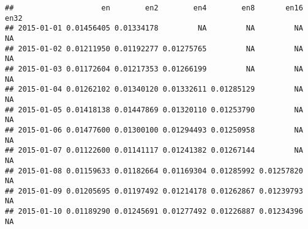 \documentclass[
]{article}
\newenvironment{Shaded}{\begin{snugshade}}{\end{snugshade}}
\newcommand{\AttributeTok}[1]{\textcolor[rgb]{0.13,0.29,0.53}{#1}}
\newcommand{\CommentTok}[1]{\textcolor[rgb]{0.56,0.35,0.01}{\textit{#1}}}
\newcommand{\DecValTok}[1]{\textcolor[rgb]{0.00,0.00,0.81}{#1}}
\newcommand{\FunctionTok}[1]{\textcolor[rgb]{0.13,0.29,0.53}{\textbf{#1}}}
\newcommand{\NormalTok}[1]{#1}
\newcommand{\OtherTok}[1]{\textcolor[rgb]{0.56,0.35,0.01}{#1}}
\newcommand{\SpecialCharTok}[1]{\textcolor[rgb]{0.81,0.36,0.00}{\textbf{#1}}}
\newcommand{\StringTok}[1]{\textcolor[rgb]{0.31,0.60,0.02}{#1}}
\begin{document}
\begin{Shaded}
\end{Shaded}

\begin{verbatim}
##                    en        en2        en4        en8       en16 en32
## 2015-01-01 0.01456405 0.01334178         NA         NA         NA   NA
## 2015-01-02 0.01211950 0.01192277 0.01275765         NA         NA   NA
## 2015-01-03 0.01172604 0.01217353 0.01266199         NA         NA   NA
## 2015-01-04 0.01262102 0.01340120 0.01332611 0.01285129         NA   NA
## 2015-01-05 0.01418138 0.01447869 0.01320110 0.01253790         NA   NA
## 2015-01-06 0.01477600 0.01300100 0.01294493 0.01250958         NA   NA
## 2015-01-07 0.01122600 0.01141117 0.01241382 0.01267144         NA   NA
## 2015-01-08 0.01159633 0.01182664 0.01169304 0.01285992 0.01257820   NA
## 2015-01-09 0.01205695 0.01197492 0.01214178 0.01262867 0.01239793   NA
## 2015-01-10 0.01189290 0.01245691 0.01277492 0.01226887 0.01234396   NA
\end{verbatim}
\end{document}
